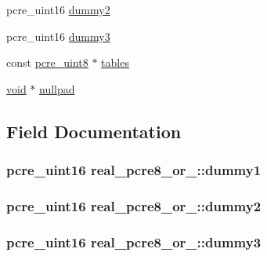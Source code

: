 \begin{DoxyCompactItemize}
\item 
pcre\+\_\+uint16 \hyperlink{structreal__pcre8__or__16_afaf0a28b17c5c9ccbd4dfa02e977c3e6}{dummy2}
\item 
pcre\+\_\+uint16 \hyperlink{structreal__pcre8__or__16_a456a6a507dba68ef96cd06109ef7bac2}{dummy3}
\item 
const \hyperlink{pcre__internal_8h_a6e9105ffeed09883190f9bf30d93e210}{pcre\+\_\+uint8} $\ast$ \hyperlink{structreal__pcre8__or__16_a7d3bcd4d462d6ddee5c24776d4ed0713}{tables}
\item 
\hyperlink{group__MOD__ISAPI_gacd6cdbf73df3d9eed42fa493d9b621a6}{void} $\ast$ \hyperlink{structreal__pcre8__or__16_a10b0d73b64bbd507894a05eab6077a7a}{nullpad}
\end{DoxyCompactItemize}


\subsection{Field Documentation}
\subsubsection[{\texorpdfstring{dummy1}{dummy1}}]{\setlength{\rightskip}{0pt plus 5cm}pcre\+\_\+uint16 real\+\_\+pcre8\+\_\+or\+\_\+::dummy1}\hypertarget{structreal__pcre8__or__16_a64619216634de06ee8d09327668e9b77}{}\label{structreal__pcre8__or__16_a64619216634de06ee8d09327668e9b77}
\subsubsection[{\texorpdfstring{dummy2}{dummy2}}]{\setlength{\rightskip}{0pt plus 5cm}pcre\+\_\+uint16 real\+\_\+pcre8\+\_\+or\+\_\+::dummy2}\hypertarget{structreal__pcre8__or__16_afaf0a28b17c5c9ccbd4dfa02e977c3e6}{}\label{structreal__pcre8__or__16_afaf0a28b17c5c9ccbd4dfa02e977c3e6}
\subsubsection[{\texorpdfstring{dummy3}{dummy3}}]{\setlength{\rightskip}{0pt plus 5cm}pcre\+\_\+uint16 real\+\_\+pcre8\+\_\+or\+\_\+::dummy3}\hypertarget{structreal__pcre8__or__16_a456a6a507dba68ef96cd06109ef7bac2}{}\label{structreal__pcre8__or__16_a456a6a507dba68ef96cd06109ef7bac2}
